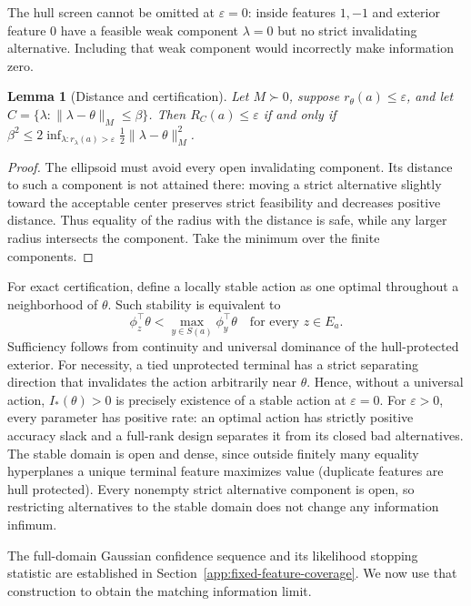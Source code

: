 \documentclass{article}
\theoremstyle{plain}
\newtheorem{lemma}[theorem]{Lemma}
\theoremstyle{definition}
\begin{document}
The hull screen cannot be omitted at $\varepsilon=0$: inside features
$1,-1$ and exterior feature $0$ have a feasible weak component
$\lambda=0$ but no strict invalidating alternative.  Including that
weak component would incorrectly make information zero.

\begin{lemma}[Distance and certification]
\label{lem:bay-distance-certificate}
Let $M\succ0$, suppose $r_\theta(a)\le\varepsilon$, and let
$C=\{\lambda:\|\lambda-\theta\|_M\le\beta\}$.
Then $R_C(a)\le\varepsilon$ if and only if
$\beta^2\le2\inf_{\lambda:r_\lambda(a)>\varepsilon}
\tfrac12\|\lambda-\theta\|_M^2$.
\end{lemma}
\begin{proof}
The ellipsoid must avoid every open invalidating component.  Its distance
to such a component is not attained there: moving a strict alternative
slightly toward the acceptable center preserves strict feasibility and
decreases positive distance.  Thus equality of the radius with the
distance is safe, while any larger radius intersects the component.
Take the minimum over the finite components.
\end{proof}

For exact certification, define a locally stable action as one optimal
throughout a neighborhood of $\theta$.  Such stability is equivalent to
\[
 \phi_z^\top\theta<\max_{y\in S(a)}\phi_y^\top\theta
                              \quad\text{for every }z\in E_a.
\]
Sufficiency follows from continuity and universal dominance of the
hull-protected exterior.  For necessity, a tied unprotected terminal
has a strict separating direction that invalidates the action
arbitrarily near $\theta$.  Hence, without a universal action,
$I_*(\theta)>0$ is precisely existence of a stable action at
$\varepsilon=0$.  For $\varepsilon>0$, every parameter has positive rate:
an optimal action has strictly positive accuracy slack and a full-rank
design separates it from its closed bad alternatives.  The stable domain
is open and dense, since outside finitely many equality hyperplanes a
unique terminal feature maximizes value (duplicate features are hull
protected).  Every nonempty strict alternative component is open, so
restricting alternatives to the stable domain does not change any
information infimum.

The full-domain Gaussian confidence sequence and its likelihood stopping statistic are established in Section~\ref{app:fixed-feature-coverage}. We now use that construction to obtain the matching information limit.
\end{document}
